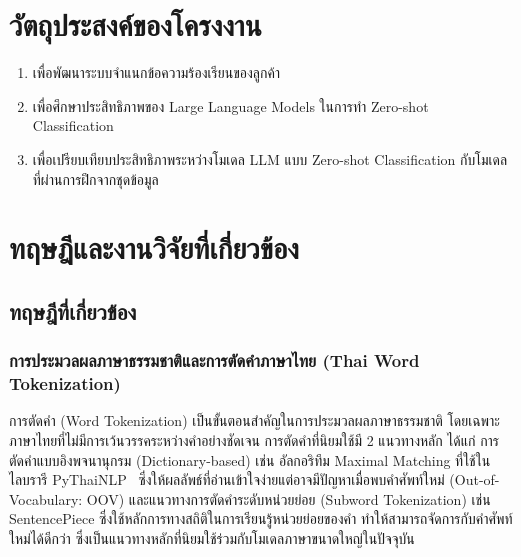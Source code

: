 \section{วัตถุประสงค์ของโครงงาน}

\begin{enumerate}
    \item เพื่อพัฒนาระบบจำแนกข้อความร้องเรียนของลูกค้า
    \item เพื่อศึกษาประสิทธิภาพของ Large Language Models ในการทำ Zero-shot Classification
    \item เพื่อเปรียบเทียบประสิทธิภาพระหว่างโมเดล LLM แบบ Zero-shot Classification กับโมเดลที่ผ่านการฝึกจากชุดข้อมูล
\end{enumerate}

\section{ทฤษฎีและงานวิจัยที่เกี่ยวข้อง}

\subsection{ทฤษฎีที่เกี่ยวข้อง}

\subsubsection{การประมวลผลภาษาธรรมชาติและการตัดคำภาษาไทย (Thai Word Tokenization)}
การตัดคำ (Word Tokenization) เป็นขั้นตอนสำคัญในการประมวลผลภาษาธรรมชาติ โดยเฉพาะภาษาไทยที่ไม่มีการเว้นวรรคระหว่างคำอย่างชัดเจน การตัดคำที่นิยมใช้มี 2 แนวทางหลัก ได้แก่ การตัดคำแบบอิงพจนานุกรม (Dictionary-based) เช่น อัลกอริทึม Maximal Matching ที่ใช้ในไลบรารี PyThaiNLP~\cite{phatthiyaphaibun2023pythainlp} ซึ่งให้ผลลัพธ์ที่อ่านเข้าใจง่ายแต่อาจมีปัญหาเมื่อพบคำศัพท์ใหม่ (Out-of-Vocabulary: OOV) และแนวทางการตัดคำระดับหน่วยย่อย (Subword Tokenization) เช่น SentencePiece ซึ่งใช้หลักการทางสถิติในการเรียนรู้หน่วยย่อยของคำ ทำให้สามารถจัดการกับคำศัพท์ใหม่ได้ดีกว่า ซึ่งเป็นแนวทางหลักที่นิยมใช้ร่วมกับโมเดลภาษาขนาดใหญ่ในปัจจุบัน

